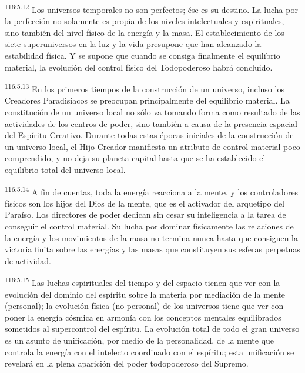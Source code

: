 \documentclass[twoside, 11pt]{book}
\begin{document}
\par
\textsuperscript{116:5.12} Los universos temporales no son perfectos; ése es su destino. La lucha por la perfección no solamente es propia de los niveles intelectuales y espirituales, sino también del nivel físico de la energía y la masa. El establecimiento de los siete superuniversos en la luz y la vida presupone que han alcanzado la estabilidad física. Y se supone que cuando se consiga finalmente el equilibrio material, la evolución del control físico del Todopoderoso habrá concluido.

\par
\textsuperscript{116:5.13} En los primeros tiempos de la construcción de un universo, incluso los Creadores Paradisíacos se preocupan principalmente del equilibrio material. La constitución de un universo local no sólo va tomando forma como resultado de las actividades de los centros de poder, sino también a causa de la presencia espacial del Espíritu Creativo. Durante todas estas épocas iniciales de la construcción de un universo local, el Hijo Creador manifiesta un atributo de control material poco comprendido, y no deja su planeta capital hasta que se ha establecido el equilibrio total del universo local.

\par
\textsuperscript{116:5.14} A fin de cuentas, toda la energía reacciona a la mente, y los controladores físicos son los hijos del Dios de la mente, que es el activador del arquetipo del Paraíso. Los directores de poder dedican sin cesar su inteligencia a la tarea de conseguir el control material. Su lucha por dominar físicamente las relaciones de la energía y los movimientos de la masa no termina nunca hasta que consiguen la victoria finita sobre las energías y las masas que constituyen sus esferas perpetuas de actividad.

\par
\textsuperscript{116:5.15} Las luchas espirituales del tiempo y del espacio tienen que ver con la evolución del dominio del espíritu sobre la materia por mediación de la mente (personal); la evolución física (no personal) de los universos tiene que ver con poner la energía cósmica en armonía con los conceptos mentales equilibrados sometidos al supercontrol del espíritu. La evolución total de todo el gran universo es un asunto de unificación, por medio de la personalidad, de la mente que controla la energía con el intelecto coordinado con el espíritu; esta unificación se revelará en la plena aparición del poder todopoderoso del Supremo.
\end{document}
